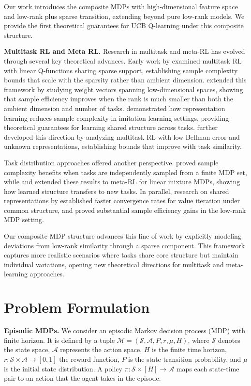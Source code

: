 Our work introduces the composite MDPs with high-dimensional feature space and low-rank plus sparse transition, extending beyond pure low-rank models. We provide the first theoretical guarantees for UCB Q-learning under this composite structure.

\smallskip
\noindent
\textbf{Multitask RL and Meta RL.}
Research in multitask and meta-RL has evolved through several key theoretical advances. Early work by \cite{calandriello2014sparse} examined multitask RL with linear Q-functions sharing sparse support, establishing sample complexity bounds that scale with the sparsity rather than ambient dimension. \cite{hu2021near} extended this framework by studying weight vectors spanning low-dimensional spaces, showing that sample efficiency improves when the rank is much smaller than both the ambient dimension and number of tasks. \cite{arora2020provable} demonstrated how representation learning reduces sample complexity in imitation learning settings, providing theoretical guarantees for learning shared structure across tasks. \cite{lu2022provable} further developed this direction by analyzing multitask RL with low Bellman error and unknown representations, establishing bounds that improve with task similarity.

Task distribution approaches offered another perspective. \cite{brunskill2013sample} proved sample complexity benefits when tasks are independently sampled from a finite MDP set, while \cite{pacchiano2022joint} and \cite{muller2022meta} extended these results to meta-RL for linear mixture MDPs, showing how learned structure transfers to new tasks. In parallel, research on shared representations by \cite{d2020sharing} established faster convergence rates for value iteration under common structure, and \cite{lu2021power} proved substantial sample efficiency gains in the low-rank MDP setting.

Our composite MDP structure advances this line of work by explicitly modeling deviations from low-rank similarity through a sparse component. This framework captures more realistic scenarios where tasks share core structure but maintain individual variations, opening new theoretical directions for multitask and meta-learning approaches.

\section{Problem Formulation} 

\noindent
\textbf{Episodic MDPs.} 
We consider an episodic Markov decision process (MDP) with finite horizon.
It is defined by a tuple $\mathcal{M} = (\mathcal{S}, \mathcal{A}, P, r, \mu, H)$, where $\mathcal{S}$ denotes the state space, $\mathcal{A}$ represents the action space, $H$ is the finite time horizon, $r: \mathcal{S} \times \mathcal{A} \to [0, 1]$ the reward function, $P$ is the state transition probability, and $\mu$ is the initial state distribution.
A policy $\pi : \mathcal{S} \times [H] \rightarrow \mathcal{A}$ maps each state-time pair to an action that the agent takes in the episode. 

